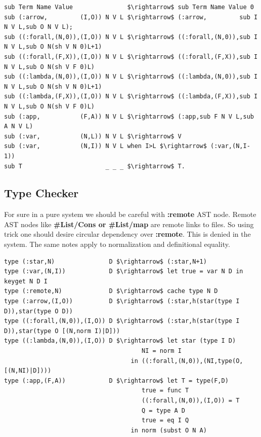 \documentclass[11pt,oneside]{article}
\begin{document}
\begin{lstlisting}[mathescape=true]
sub Term Name Value               $\rightarrow$ sub Term Name Value 0
sub (:arrow,         (I,O)) N V L $\rightarrow$ (:arrow,         sub I N V L,sub O N V L);
sub ((:forall,(N,0)),(I,O)) N V L $\rightarrow$ ((:forall,(N,0)),sub I N V L,sub O N(sh V N 0)L+1)
sub ((:forall,(F,X)),(I,O)) N V L $\rightarrow$ ((:forall,(F,X)),sub I N V L,sub O N(sh V F 0)L)
sub ((:lambda,(N,0)),(I,O)) N V L $\rightarrow$ ((:lambda,(N,0)),sub I N V L,sub O N(sh V N 0)L+1)
sub ((:lambda,(F,X)),(I,O)) N V L $\rightarrow$ ((:lambda,(F,X)),sub I N V L,sub O N(sh V F 0)L)
sub (:app,           (F,A)) N V L $\rightarrow$ (:app,sub F N V L,sub A N V L)
sub (:var,           (N,L)) N V L $\rightarrow$ V
sub (:var,           (N,I)) N V L when I>L $\rightarrow$ (:var,(N,I-1))
sub T                       _ _ _ $\rightarrow$ T.
\end{lstlisting}

\newpage
\subsection{Type Checker}

For sure in a pure system we should be careful with {\bf :remote} AST node. Remote
AST nodes like {\bf \#List/Cons or \#List/map} are remote links to files. So using
trick one should desire circular dependency over {\bf :remote}. This is denied in
the system. The same notes apply to normalization and definitional equality.

\begin{lstlisting}[mathescape=true]
type (:star,N)               D $\rightarrow$ (:star,N+1)
type (:var,(N,I))            D $\rightarrow$ let true = var N D in keyget N D I
type (:remote,N)             D $\rightarrow$ cache type N D
type (:arrow,(I,O))          D $\rightarrow$ (:star,h(star(type I D)),star(type O D))
type ((:forall,(N,0)),(I,O)) D $\rightarrow$ (:star,h(star(type I D)),star(type O [(N,norm I)|D]))
type ((:lambda,(N,0)),(I,O)) D $\rightarrow$ let star (type I D)
                                      NI = norm I
                                   in ((:forall,(N,0)),(NI,type(O,[(N,NI)|D])))
type (:app,(F,A))            D $\rightarrow$ let T = type(F,D)
                                      true = func T
                                      ((:forall,(N,0)),(I,O)) = T
                                      Q = type A D
                                      true = eq I Q
                                   in norm (subst O N A)
\end{lstlisting}
\end{document}
